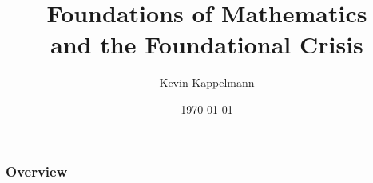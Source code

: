 \documentclass{beamer}
\title[Mathematical Foundations and the Foundational Crisis]{Foundations of Mathematics\\and the Foundational Crisis} %
\author{Kevin Kappelmann} %
\institute[TUM] %
{Technical University of Munich}
\date{\today} %
\begin{document}
\begin{frame}
\titlepage %
\end{frame}

\begin{frame}
    \frametitle{Overview} 
        \tableofcontents
\end{frame}
\end{document}
